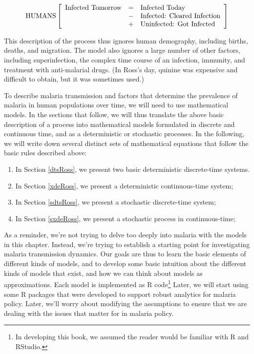 \documentclass[
]{book}
\begin{document}
\[
\mbox{HUMANS} 
\\ \; \\
\left[
\begin{array}{rcl}
\mbox{Infected Tomorrow} &=& \mbox{Infected Today} \;\; \\
&-& \mbox{Infected: Cleared Infection}\\
&+& \mbox{Uninfected: Got Infected}\\
\end{array} \right]
\]

This description of the process thus ignores human demography, including births, deaths, and migration. The model also ignores a large number of other factors, including superinfection, the complex time course of an infection, immunity, and treatment with anti-malarial drugs. (In Ross's day, quinine was expensive and difficult to obtain, but it was sometimes used.)

To describe malaria transmission and factors that determine the prevalence of malaria in human populations over time, we will need to use mathematical models.
In the sections that follow, we will thus translate the above basic description of a process into mathematical models
formulated in discrete and continuous time, and as a deterministic or stochastic processes.
In the following, we will write down several distinct sets of mathematical equations that follow the basic rules described above:

\begin{enumerate}
\def\labelenumi{\arabic{enumi}.}
\item
  In Section \ref{dtsRoss}, we present two basic deterministic discrete-time systems.
\item
  In Section \ref{xdeRoss}, we present a deterministic continuous-time system;
\item
  In Section \ref{sdtsRoss}, we present a stochastic discrete-time system;
\item
  In Section \ref{sxdeRoss}, we present a stochastic process in continuous-time;
\end{enumerate}

As a reminder, we're not trying to delve too deeply into malaria with the models in this chapter.
Instead, we're trying to establish a starting point for investigating malaria transmission dynamics.
Our goals are thus to learn the basic elements of different kinds of models, and to develop some basic intuition about the different kinds of models that exist, and how we can think about models as approximations.
Each model is implemented as R code\footnote{In developing this book, we assumed the reader would be familiar with R and RStudio.}
Later, we will start using some R packages that were developed to support robust analytics for malaria policy.
Later, we'll worry about modifying the assumptions to ensure that we are dealing with the issues that matter for in malaria policy.
\end{document}
